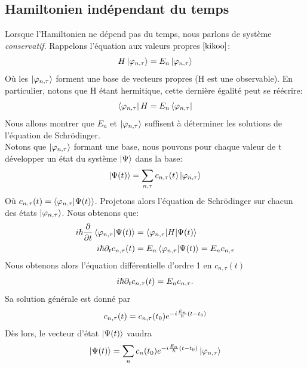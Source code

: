 \documentclass[../notesdecours.tex]{subfiles}
\begin{document}
\subsection{Hamiltonien indépendant du temps}
Lorsque l'Hamiltonien ne dépend pas du temps, nous parlons de système \emph{conservatif}. Rappelons l'équation aux valeurs propres $\eqref{kikoo}$:
\begin{equation*}
H\ket{\varphi_{n,\tau}} = E_n \ket{\varphi_{n,\tau}}
\end{equation*}
Où les $\ket{\varphi_{n,\tau}}$ forment une base de vecteurs propres (H est une observable). En particulier, notons que H étant hermitique, cette dernière égalité peut se réécrire:
\begin{equation}
\bra{\varphi_{n,\tau}}H = E_n \bra{\varphi_{n,\tau}}
\end{equation}
Nous allons montrer que $E_n$ et $\ket{\varphi_{n,\tau}}$ suffisent à déterminer les solutions de l'équation de Schrödinger.\\

Notons que $\ket{\varphi_{n,\tau}}$ formant une base, nous pouvons pour chaque valeur de t développer un état du système $\ket{\Psi}$ dans la base:
\begin{equation}
\ket{\Psi (t)} = \sum_{n,\tau} c_{n,\tau} (t)\ket{\varphi_{n,\tau}}
\end{equation}
Où $c_{n,\tau}(t) = \braket{\varphi_{n,\tau}|\Psi (t)}$. Projetons alors l'équation de Schrödinger sur chacun des états $\ket{\varphi_{n,\tau}}$. Nous obtenons que:
\begin{align*}
i\hbar\frac{\partial}{\partial t}\braket{\varphi_{n,\tau}|\Psi (t)} &= \braket{\varphi_{n,\tau} | H | \Psi (t)}\\
i\hbar\partial_tc_{n,\tau}(t) &= E_n \braket{\varphi_{n,\tau}|\Psi(t)} = E_nc_{n,\tau}
\end{align*}
Nous obtenons alors l'équation différentielle d'ordre 1 en $c_{n,\tau} (t)$
\begin{equation}
i\hbar\partial_tc_{n,\tau}(t) = E_nc_{n,\tau}.
\end{equation}
Sa solution générale est donné par 
\begin{equation}
c_{n,\tau} (t) = c_{n,\tau} (t_0) e^{-i \frac{E_n}{\hbar} (t-t_0)}
\end{equation}
Dès lors, le vecteur d'état $\ket{\Psi(t)}$ vaudra
\begin{equation}
\ket{\Psi(t)} = \sum_n c_n(t_0)e^{-i\frac{E_n}{\hbar}(t-t_0)} \ket{\varphi_{n,\tau}}
\end{equation}
\end{document}
